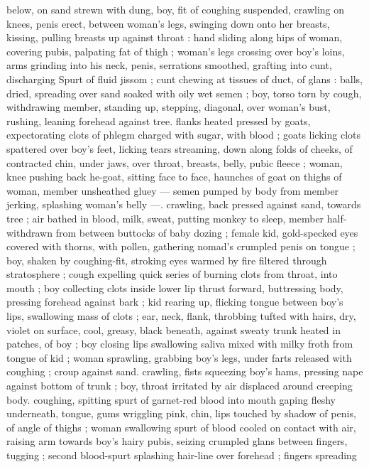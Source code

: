 below, on sand strewn with dung, boy, fit of coughing suspended, 
crawling on knees, penis erect, between woman's legs, swinging 
down onto her breasts, kissing, pulling breasts up against throat : 
hand sliding along hips of woman, covering pubis, palpating fat of 
thigh ; woman's legs crossing over boy's loins, arms grinding into his 
neck, penis, serrations smoothed, grafting into cunt, discharging 
Spurt of fluid jissom ; cunt chewing at tissues of duct, of glans : 
balls, dried, spreading over sand soaked with oily wet semen ; boy, 
torso torn by cough, withdrawing member, standing up, stepping, 
diagonal, over woman's bust, rushing, leaning forehead against tree. 
flanks heated pressed by goats, expectorating clots of phlegm 
charged with sugar, with blood ; goats licking clots spattered over 
boy's feet, licking tears streaming, down along folds of cheeks, of 
contracted chin, under jaws, over throat, breasts, belly, pubic fleece 
; woman, knee pushing back he-goat, sitting face to face, haunches 
of goat on thighs of woman, member unsheathed gluey --- semen 
pumped by body from member jerking, splashing woman's belly ---. 
crawling, back pressed against sand, towards tree ; air bathed in 
blood, milk, sweat, putting monkey to sleep, member half-withdrawn 
from between buttocks of baby dozing ; female kid, gold-specked 
eyes covered with thorns, with pollen, gathering nomad's crumpled 
penis on tongue ; boy, shaken by coughing-fit, stroking eyes warmed 
by fire filtered through stratosphere ; cough expelling quick series of 
burning clots from throat, into mouth ; boy collecting clots inside 
lower lip thrust forward, buttressing body, pressing forehead against 
bark ; kid rearing up, flicking tongue between boy's lips, swallowing 
mass of clots ; ear, neck, flank, throbbing tufted with hairs, dry, violet 
on surface, cool, greasy, black beneath, against sweaty trunk heated 
in patches, of boy ; boy closing lips swallowing saliva mixed with 
milky froth from tongue of kid ; woman sprawling, grabbing boy's 
legs, under farts released with coughing ; croup against sand. 
crawling, fists squeezing boy's hams, pressing nape against bottom 
of trunk ; boy, throat irritated by air displaced around creeping body. 
coughing, spitting spurt of garnet-red blood into mouth gaping 
fleshy underneath, tongue, gums wriggling pink, chin, lips touched 
by shadow of penis, of angle of thighs ; woman swallowing spurt of 
blood cooled on contact with air, raising arm towards boy's hairy 
pubis, seizing crumpled glans between fingers, tugging ; second 
blood-spurt splashing hair-line over forehead ; fingers spreading 
